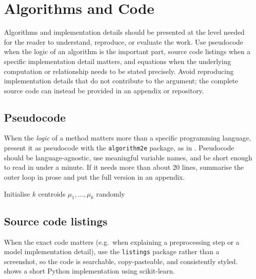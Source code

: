 \section{Algorithms and Code}
\label{sec:algorithms}
Algorithms and implementation details should be presented at the level
needed for the reader to understand, reproduce, or evaluate the work.
Use pseudocode when the logic of an algorithm is the important part, source
code listings when a specific implementation detail matters, and equations
when the underlying computation or relationship needs to be stated
precisely. Avoid reproducing implementation details that do not contribute
to the argument; the complete source code can instead be provided in an
appendix or repository.

\subsection{Pseudocode}
When the \emph{logic} of a method matters more than a specific programming
language, present it as pseudocode with the \texttt{algorithm2e} package,
as in . Pseudocode should be language-agnostic, use
meaningful variable names, and be short enough to read in under a minute.
If it needs more than about 20 lines, summarise the outer loop in prose and
put the full version in an appendix.

\begin{algorithm}[htbp]
  \DontPrintSemicolon

  Initialise $k$ centroids $\mu_1,\ldots,\mu_k$ randomly\;
  

  \;

  \caption{K-means clustering}
  \label{alg:kmeans}
\end{algorithm}

\subsection{Source code listings}
When the exact code matters (e.g.\ when explaining a preprocessing step or
a model implementation detail), use the \texttt{listings} package rather
than a screenshot, so the code is searchable, copy-pasteable, and
consistently styled.  shows a short Python implementation
using scikit-learn.

